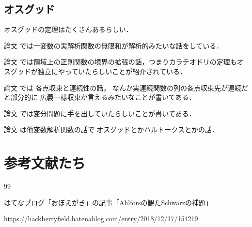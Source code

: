 \documentclass[leqno, a4paper, 12pt]{jsarticle}
\begin{document}
\subsection{オスグッド}
オスグッドの定理はたくさんあるらしい．

論文
\cite{MR1502274}
では一変数の実解析関数の無限和が解析的みたいな話をしている．

論文
\cite{MR0220914}
では領域上の正則関数の境界の拡張の話，つまりカラテオドリの定理もオスグッドが独立にやっていたらしいことが紹介されている．

論文
\cite{MR0042500}
では
各点収束と連続性の話，
なんか実連続関数の列の各点収束先が連続だと部分的に
広義一様収束が言えるみたいなことが書いてある．

論文
\cite{MR1500577}
では変分問題に手を出していたらしいことが書いてある．


論文
\cite{MR2794615}
は他変数解析関数の話で
オスグッドとかハルトークスとかの話．

\section*{参考文献たち}



\renewcommand{\refname}{ブログ記事}
	
\begin{thebibliography}{99}

はてなブログ「おぼえがき」の記事「Ahlforsの観たSchwarzの補題」

https://hackberryfield.hatenablog.com/entry/2018/12/17/154219
\end{thebibliography}


\renewcommand{\refname}{一般の参考文献}
\nocite{*}


\end{document}
